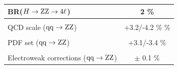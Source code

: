 \begin{table}[!htb]
\begin{center}
\begin{tabular}{|lc|}
BR($H \rightarrow \mathrm{Z}\mathrm{Z} \rightarrow 4\ell$) & 2 \% \\
\hline %
\vspace{-0.4cm} & \\
QCD scale ($\mathrm{q}\mathrm{q}\rightarrow \mathrm{Z}\mathrm{Z}$) & +3.2/-4.2 \% \% \\
\vspace{-0.4cm} & \\
PDF set ($\mathrm{q}\mathrm{q}\rightarrow \mathrm{Z}\mathrm{Z}$) & +3.1/-3.4 \% \\
\vspace{-0.4cm} & \\
Electroweak corrections ($\mathrm{q}\mathrm{q}\rightarrow \mathrm{Z}\mathrm{Z}$) & $\pm$ 0.1 \% \\
\hline %
\hline %
\end{tabular}
\normalsize
\end{center}
\end{table}




